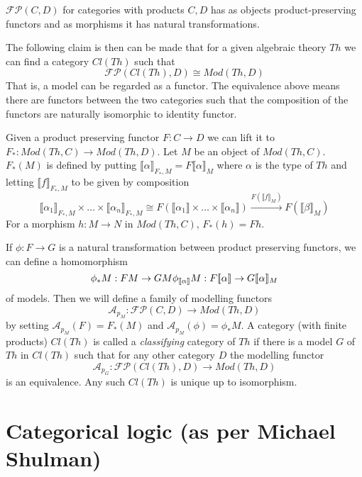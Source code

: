 \documentclass[acmsmall,screen, nonacm, anonymous]{acmart}
\begin{document}
\begin{definition}
  $\mathcal{FP}(C,D)$ for categories with products $C,D$ has as objects product-preserving functors and as morphisms it has natural transformations.
\end{definition}

The following claim is then can be made that for a given algebraic theory $Th$ we can find a category $Cl(Th)$ such that
\[
\mathcal{FP}(Cl(Th),D) \cong Mod(Th,D)
\]
That is, a model can be regarded as a functor. 
The equivalence above means there are functors between the two categories such that the composition of the functors are naturally isomorphic to identity functor.

Given a product preserving functor $F : C \to D$ we can lift it to $F_{*} : Mod(Th, C) \to Mod(Th,D)$.
Let $M$ be an object of $Mod(Th,C)$.
$F_{*}(M)$ is defined by putting $\llbracket \alpha \rrbracket_{F_{*}, M} = F\llbracket \alpha \rrbracket_{M}$ where $\alpha$ is the type of $Th$ and letting
$\llbracket f \rrbracket_{F_{*},M}$ to be given by composition
\[
  \llbracket \alpha_{1} \rrbracket_{F_{*}, M} \times \ldots \times \llbracket \alpha_{n} \rrbracket_{F_{*}, M} \cong F(\llbracket \alpha_{1} \rrbracket \times \ldots \times \llbracket \alpha_{n} \rrbracket) \xrightarrow{F(\llbracket f \rrbracket_{M})} F(\llbracket \beta \rrbracket_{M})
\]
For a morphism $h : M \to N$ in $Mod(Th,C)$, $F_{*}(h) = Fh$.

If $\phi : F \to G$ is a natural transformation between product preserving functors, we can define a homomorphism
\[
\phi_{*}M : FM \to GM\\
\phi_{\llbracket \alpha \rrbracket}M : F\llbracket \alpha \rrbracket \to G\llbracket \alpha \rrbracket_{M}
\]
of models.
Then we will define a family of modelling functors
\[
\mathcal{A}_{p_{M}} : \mathcal{FP}(C,D) \to Mod(Th,D)
\]
by setting $\mathcal{A}_{p_{M}}(F) = F_{*}(M)$ and $\mathcal{A}_{p_{M}}(\phi) = \phi_{*}M$.
A category (with finite products) $Cl(Th)$ is called a \emph{classifying} category of $Th$ if there is a model $G$ of $Th$ in $Cl(Th)$ such that for any other category $D$ the modelling functor
\[
\mathcal{A}_{p_{G}} : \mathcal{FP}(Cl(Th),D) \to Mod(Th,D)
\]
is an equivalence.
Any such $Cl(Th)$ is unique up to isomorphism.


\section{Categorical logic (as per Michael Shulman)}
\end{document}
